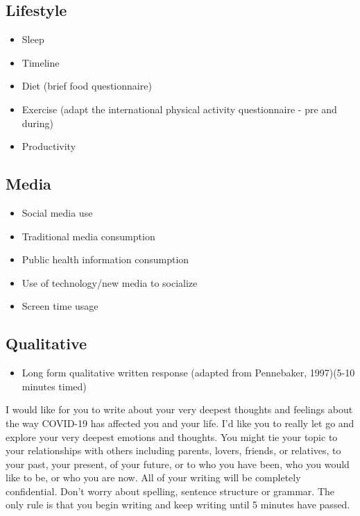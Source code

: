 \documentclass[]{book}
\providecommand{\tightlist}{%
  \setlength{\itemsep}{0pt}\setlength{\parskip}{0pt}}
\begin{document}
\hypertarget{lifestyle}{%
\subsection{Lifestyle}\label{lifestyle}}

\begin{itemize}
\tightlist
\item
  Sleep
\item
  Timeline
\item
  Diet (brief food questionnaire)
\item
  Exercise (adapt the international physical activity questionnaire - pre and during)
\item
  Productivity
\end{itemize}

\hypertarget{media}{%
\subsection{Media}\label{media}}

\begin{itemize}
\tightlist
\item
  Social media use
\item
  Traditional media consumption
\item
  Public health information consumption
\item
  Use of technology/new media to socialize
\item
  Screen time usage
\end{itemize}

\hypertarget{qualitative}{%
\subsection{Qualitative}\label{qualitative}}

\begin{itemize}
\tightlist
\item
  Long form qualitative written response (adapted from Pennebaker, 1997)(5-10 minutes timed)
\end{itemize}

I would like for you to write about your very deepest thoughts and feelings about the way COVID-19 has affected you and your life. I'd like you to really let go and explore your very deepest emotions and thoughts. You might tie your topic to your relationships with others including parents, lovers, friends, or relatives, to your past, your present, of your future, or to who you have been, who you would like to be, or who you are now. All of your writing will be completely confidential. Don't worry about spelling, sentence structure or grammar. The only rule is that you begin writing and keep writing until 5 minutes have passed.
\end{document}
